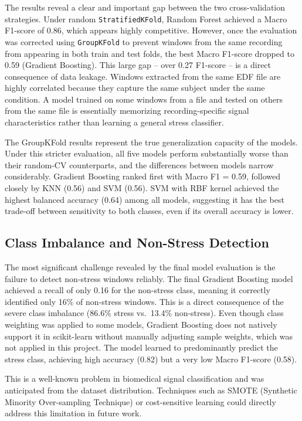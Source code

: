 \documentclass[12pt,a4paper]{article}
\begin{document}
	The results reveal a clear and important gap between the two cross-validation strategies. Under random \texttt{StratifiedKFold}, Random Forest achieved a Macro F1-score of 0.86, which appears highly competitive. However, once the evaluation was corrected using \texttt{GroupKFold} to prevent windows from the same recording from appearing in both train and test folds, the best Macro F1-score dropped to 0.59 (Gradient Boosting). This large gap -- over 0.27 F1-score -- is a direct consequence of data leakage. Windows extracted from the same EDF file are highly correlated because they capture the same subject under the same condition. A model trained on some windows from a file and tested on others from the same file is essentially memorizing recording-specific signal characteristics rather than learning a general stress classifier.

	The GroupKFold results represent the true generalization capacity of the models. Under this stricter evaluation, all five models perform substantially worse than their random-CV counterparts, and the differences between models narrow considerably. Gradient Boosting ranked first with Macro F1 = 0.59, followed closely by KNN (0.56) and SVM (0.56). SVM with RBF kernel achieved the highest balanced accuracy (0.64) among all models, suggesting it has the best trade-off between sensitivity to both classes, even if its overall accuracy is lower.

	\subsection{Class Imbalance and Non-Stress Detection}

	The most significant challenge revealed by the final model evaluation is the failure to detect non-stress windows reliably. The final Gradient Boosting model achieved a recall of only 0.16 for the non-stress class, meaning it correctly identified only 16\% of non-stress windows. This is a direct consequence of the severe class imbalance (86.6\% stress vs.\ 13.4\% non-stress). Even though class weighting was applied to some models, Gradient Boosting does not natively support it in scikit-learn without manually adjusting sample weights, which was not applied in this project. The model learned to predominantly predict the stress class, achieving high accuracy (0.82) but a very low Macro F1-score (0.58).

	This is a well-known problem in biomedical signal classification and was anticipated from the dataset distribution. Techniques such as SMOTE (Synthetic Minority Over-sampling Technique) or cost-sensitive learning could directly address this limitation in future work.
\end{document}
